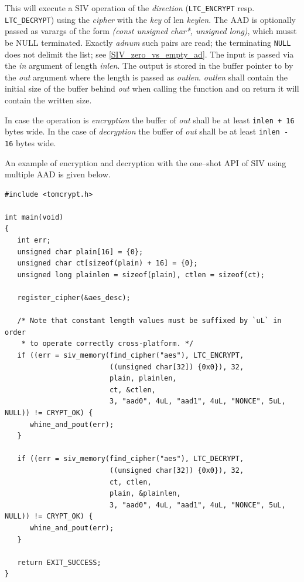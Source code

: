 \documentclass[synpaper]{book}
\begin{document}
This will execute a SIV operation of the \textit{direction} (\texttt{LTC\_ENCRYPT} resp. \texttt{LTC\_DECRYPT})
using the \textit{cipher} with the \textit{key} of len \textit{keylen}.
The AAD is optionally passed as varargs of the form \textit{(const unsigned char*, unsigned long)}, which musst be
NULL terminated.
Exactly \textit{adnum} such pairs are read; the terminating \texttt{NULL} does not delimit the list; see \ref{SIV_zero_vs_empty_ad}.
The input is passed via the \textit{in} argument of length \textit{inlen}.
The output is stored in the buffer pointer to by the \textit{out} argument where the length is passed as \textit{outlen}.
\textit{outlen} shall contain the initial size of the buffer behind \textit{out} when calling the function and on
return it will contain the written size.

In case the operation is \textit{encryption} the buffer of \textit{out} shall be at least \texttt{inlen + 16} bytes wide.
In the case of \textit{decryption} the buffer of \textit{out} shall be at least \texttt{inlen - 16} bytes wide.

An example of encryption and decryption with the one--shot API of SIV using multiple AAD is given below.

\begin{small}
\begin{verbatim}
#include <tomcrypt.h>

int main(void)
{
   int err;
   unsigned char plain[16] = {0};
   unsigned char ct[sizeof(plain) + 16] = {0};
   unsigned long plainlen = sizeof(plain), ctlen = sizeof(ct);

   register_cipher(&aes_desc);

   /* Note that constant length values must be suffixed by `uL` in order
    * to operate correctly cross-platform. */
   if ((err = siv_memory(find_cipher("aes"), LTC_ENCRYPT,
                         ((unsigned char[32]) {0x0}), 32,
                         plain, plainlen,
                         ct, &ctlen,
                         3, "aad0", 4uL, "aad1", 4uL, "NONCE", 5uL, NULL)) != CRYPT_OK) {
      whine_and_pout(err);
   }

   if ((err = siv_memory(find_cipher("aes"), LTC_DECRYPT,
                         ((unsigned char[32]) {0x0}), 32,
                         ct, ctlen,
                         plain, &plainlen,
                         3, "aad0", 4uL, "aad1", 4uL, "NONCE", 5uL, NULL)) != CRYPT_OK) {
      whine_and_pout(err);
   }

   return EXIT_SUCCESS;
}
\end{verbatim}
\end{small}
\end{document}
